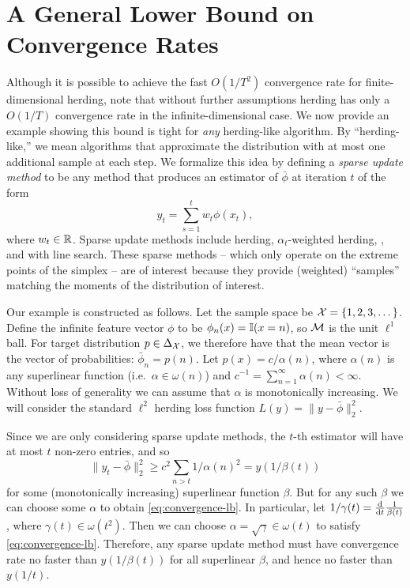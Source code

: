\documentclass[paper.tex]{subfiles}
\begin{document}
\section{A General Lower Bound on Convergence Rates}
\label{sec:lower-bounds}

Although it is possible to achieve the fast $O(1/T^{2})$ convergence rate for finite-dimensional herding, \citet{Bach:2012a} note that without further assumptions herding has only a $O(1/T)$ convergence rate in the infinite-dimensional case. We now provide an example showing this bound is tight for {\em any} herding-like algorithm.  By ``herding-like,'' we mean algorithms that approximate the distribution with at most one additional sample at each step. We formalize this idea by defining a {\em sparse update method} to be any method that produces an estimator of $\bar \phi$ at iteration $t$ of the form 
\[
y_{t} = \sum_{s =1}^{t}w_{t} \phi(x_{t}),
\]
where $w_{t} \in \mathbb{R}$. Sparse update methods include herding, $\alpha_{t}$-weighted herding, \cgd, and  \cgd with line search. These sparse methods -- which only operate on the extreme points of the simplex -- are of interest because they provide (weighted) ``samples'' matching the moments of the distribution of interest. 

Our example is constructed as follows. Let the sample space be $\mathcal{X} = \{ 1, 2, 3, \dots\}$. Define the infinite feature vector $\phi$ to be $\phi_{n}(x) = \mathbb{I}(x = n)$, so $\mathcal{M}$ is the unit $\ell^{1}$ ball. For target distribution $p \in \Delta_{\mathcal{X}}$, we therefore have  that the mean vector is the vector of probabilities: $\bar\phi_{n} = p(n)$. Let $p(x) = c/\alpha(n)$, where $\alpha(n)$ is any superlinear function (i.e.~$\alpha \in \omega(n)$) and $c^{-1} = \sum_{n=1}^{\infty} \alpha(n) < \infty$. Without loss of generality we can assume that $\alpha$ is monotonically increasing.  We will consider the standard $\ell^{2}$ herding loss function $L(y) = \|y - \bar \phi\|_2^2$. 

Since we are only considering sparse update methods, the $t$-th estimator will have at most $t$ non-zero entries, and so 
\[
\|y_{t}- \bar \phi\|_2^2 \ge c^{2}\sum_{n > t} 1/\alpha(n)^{2} = y(1/\beta(t)) \label{eq:convergence-lb}
\]
for some (monotonically increasing) superlinear function $\beta$. But for any such $\beta$ we can choose some $\alpha$ to obtain \eqref{eq:convergence-lb}. In particular, let $1/\gamma(t) = \frac{\mathrm{d}}{\mathrm{d} t}\frac{1}{\beta(t)}$, where $\gamma(t) \in \omega(t^{2})$. Then we can choose $\alpha = \sqrt \gamma \in \omega(t)$ to satisfy \eqref{eq:convergence-lb}. Therefore, any sparse update method must have convergence rate no faster than $y(1/\beta(t))$ for all superlinear $\beta$, and hence no faster than $y(1/t)$. 
\end{document}
